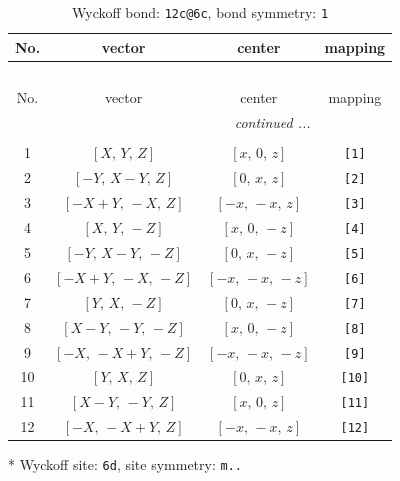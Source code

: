 \documentclass[fleqn,8pt]{jsarticle}
\begin{document}
\begin{longtable}{cccc}
\caption{Wyckoff bond: {\tt 12c@6c}, bond symmetry: {\tt 1}}
 \\
 \hline \hline
No. & vector & center & mapping \\ \hline \endfirsthead

\multicolumn{3}{l}{\tablename\ \thetable{}} \\
 \hline \hline
No. & vector & center & mapping \\ \hline \endhead

 \hline \hline
\multicolumn{3}{r}{\footnotesize\it continued ...} \\ \endfoot

 \hline \hline
\multicolumn{3}{r}{} \\ \endlastfoot

1 & $\left[ X,\, Y,\, Z \right]$ & $\left[ x,\, 0,\, z \right]$ & {\tt [1]} \\ \hline
2 & $\left[ - Y,\, X - Y,\, Z \right]$ & $\left[ 0,\, x,\, z \right]$ & {\tt [2]} \\ \hline
3 & $\left[ - X + Y,\, - X,\, Z \right]$ & $\left[ - x,\, - x,\, z \right]$ & {\tt [3]} \\ \hline
4 & $\left[ X,\, Y,\, - Z \right]$ & $\left[ x,\, 0,\, - z \right]$ & {\tt [4]} \\ \hline
5 & $\left[ - Y,\, X - Y,\, - Z \right]$ & $\left[ 0,\, x,\, - z \right]$ & {\tt [5]} \\ \hline
6 & $\left[ - X + Y,\, - X,\, - Z \right]$ & $\left[ - x,\, - x,\, - z \right]$ & {\tt [6]} \\ \hline
7 & $\left[ Y,\, X,\, - Z \right]$ & $\left[ 0,\, x,\, - z \right]$ & {\tt [7]} \\ \hline
8 & $\left[ X - Y,\, - Y,\, - Z \right]$ & $\left[ x,\, 0,\, - z \right]$ & {\tt [8]} \\ \hline
9 & $\left[ - X,\, - X + Y,\, - Z \right]$ & $\left[ - x,\, - x,\, - z \right]$ & {\tt [9]} \\ \hline
10 & $\left[ Y,\, X,\, Z \right]$ & $\left[ 0,\, x,\, z \right]$ & {\tt [10]} \\ \hline
11 & $\left[ X - Y,\, - Y,\, Z \right]$ & $\left[ x,\, 0,\, z \right]$ & {\tt [11]} \\ \hline
12 & $\left[ - X,\, - X + Y,\, Z \right]$ & $\left[ - x,\, - x,\, z \right]$ & {\tt [12]} \\
\end{longtable}
* Wyckoff site: {\tt 6d}, site symmetry: {\tt m..}
\renewcommand{\arraystretch}{1.2}
\end{document}
